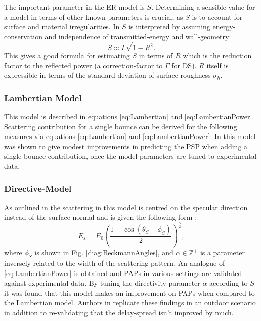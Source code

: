 \documentclass[lettersize,journal]{IEEEtran}
\begin{document}
The important parameter in the ER model is $S$. Determining a sensible value for a model in terms of other known parameters is crucial, as $S$ is to account for surface and material irregularities. In \cite{ref:degliThird} $S$ is interpreted by assuming energy-conservation and independence of transmitted-energy and wall-geometry:
\begin{equation}
S \approx \Gamma \sqrt{1- R^2}.
\end{equation}
This gives a good formula for estimating $S$ in terms of $R$ which is the reduction factor to the reflected power (a correction-factor to $\Gamma$ for DS). $R$ itself is expressible \cite{ref:degliSecond} in terms of the standard deviation of surface roughness $\sigma_h$.

\subsubsection{Lambertian Model} \label{lambModel}
This model is described in equations \eqref{eq:Lambertian} and \eqref{eq:LambertianPower}.  
Scattering contribution for a single bounce can be derived \cite{ref:degliSecond,ref:degliThird} for the following measures via equations \eqref{eq:Lambertian} and  \eqref{eq:LambertianPower}:
In \cite{ref:degliSecond} this model was shown to give modest improvements in predicting the PSP when adding a single bounce contribution, once the model parameters are tuned to experimental data.
\subsubsection{Directive-Model} \label{directiveModel}
As outlined in \cite{ref:degliThird} the scattering in this model is centred on the specular direction instead of the surface-normal and is given the following form :
\begin{equation}
	E_s = E_0 \left(\frac{1+ \cos(\theta_S-\phi_S)}{2} \right)^{\frac{\alpha}{2}}, \label{eq:directiveModel}
\end{equation}
where $\phi_S$ is shown in Fig. \ref{diag:BeckmannAngles}, and $\alpha \in \mathbb{Z}^{+}$ is a parameter inversely related to the width of the scattering pattern.
An analogue of \eqref{eq:LambertianPower} is obtained and PAPs in various settings are validated against experimental data. By tuning the directivity parameter $\alpha$ according to $S$ it was found that this model makes an improvement on PAPs when compared to the Lambertian model. Authors in \cite{ref:directiveRepl} replicate these findings in an outdoor scenario in addition to re-validating that the delay-spread isn't improved by much.
\end{document}
